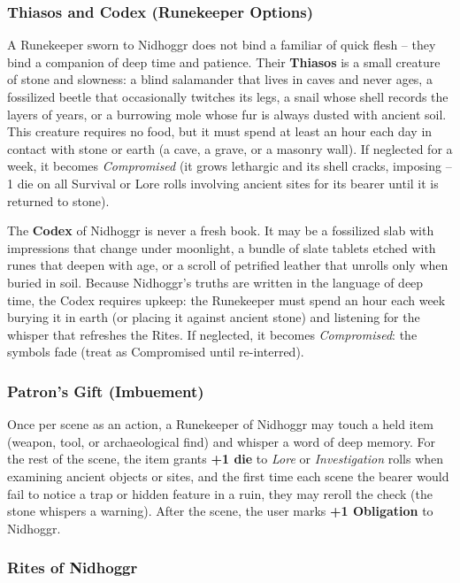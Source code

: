 \subsubsection*{Thiasos and Codex (Runekeeper Options)}

A Runekeeper sworn to Nidhoggr does not bind a familiar of quick flesh -- they bind a companion of deep time and patience. Their \textbf{Thiasos} is a small creature of stone and slowness: a blind salamander that lives in caves and never ages, a fossilized beetle that occasionally twitches its legs, a snail whose shell records the layers of years, or a burrowing mole whose fur is always dusted with ancient soil. This creature requires no food, but it must spend at least an hour each day in contact with stone or earth (a cave, a grave, or a masonry wall). If neglected for a week, it becomes \textit{Compromised} (it grows lethargic and its shell cracks, imposing --1 die on all Survival or Lore rolls involving ancient sites for its bearer until it is returned to stone).

The \textbf{Codex} of Nidhoggr is never a fresh book. It may be a fossilized slab with impressions that change under moonlight, a bundle of slate tablets etched with runes that deepen with age, or a scroll of petrified leather that unrolls only when buried in soil. Because Nidhoggr's truths are written in the language of deep time, the Codex requires upkeep: the Runekeeper must spend an hour each week burying it in earth (or placing it against ancient stone) and listening for the whisper that refreshes the Rites. If neglected, it becomes \textit{Compromised}: the symbols fade (treat as Compromised until re-interred).

\subsubsection*{Patron's Gift (Imbuement)}

Once per scene as an action, a Runekeeper of Nidhoggr may touch a held item (weapon, tool, or archaeological find) and whisper a word of deep memory. For the rest of the scene, the item grants \textbf{+1 die} to \textit{Lore} or \textit{Investigation} rolls when examining ancient objects or sites, and the first time each scene the bearer would fail to notice a trap or hidden feature in a ruin, they may reroll the check (the stone whispers a warning). After the scene, the user marks \textbf{+1 Obligation} to Nidhoggr.

\subsubsection*{Rites of Nidhoggr}

